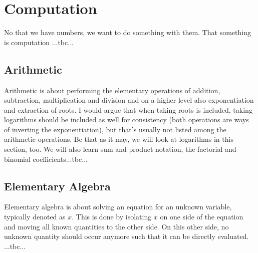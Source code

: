 \section{Computation}
No that we have numbers, we want to do something with them. That something is computation ...tbc...

\subsection{Arithmetic}
Arithmetic is about performing the elementary operations of addition, subtraction, multiplication and division and on a higher level also exponentiation and extraction of roots. I would argue that when taking roots is included, taking logarithms should be included as well for consistency (both operations are ways of inverting the exponentiation), but that's usually not listed among the arithmetic operations. Be that as it may, we will look at logarithms in this section, too. We will also learn sum and product notation, the factorial and binomial coefficients...tbc...


\begin{comment}

ToDo:

-introduce positional number systems, in particular decimal and maybe binary as alternative
-give algorithms for long addition, subtraction, multiplication, division
-maybe also for numbers in scientific notation, i.e. floating point numbers
-introduce sum and product notation
 -mayby with a spoiler to infinite sums, use $\sum_{k=1}^{\infty} (1/10)^k = 0.1111... = 1/9$ as example
-introduce factorials and binomial coefficients

References:

https://en.wikipedia.org/wiki/Arithmetic
https://www.britannica.com/science/arithmetic
https://en.wikipedia.org/wiki/Positional_notation
https://en.wikipedia.org/wiki/Mixed_radix


\end{comment}


\subsection{Elementary Algebra}
Elementary algebra is about solving an equation for an unknown variable, typically denoted as $x$. This is done by isolating $x$ on one side of the equation and moving all known quantities to the other side. On this other side, no unknown quantity should occur anymore such that it can be directly evaluated. ...tbc...


\begin{comment}

ToDo:
-make a (sub)section "Algebraic Reasoning" analogous to the "Geometric Reasoning" section in the Geometry chapter, so we can refer from there to here for analogies

References:

https://en.wikipedia.org/wiki/Elementary_algebra
https://en.wikipedia.org/wiki/Equation

\end{comment}



